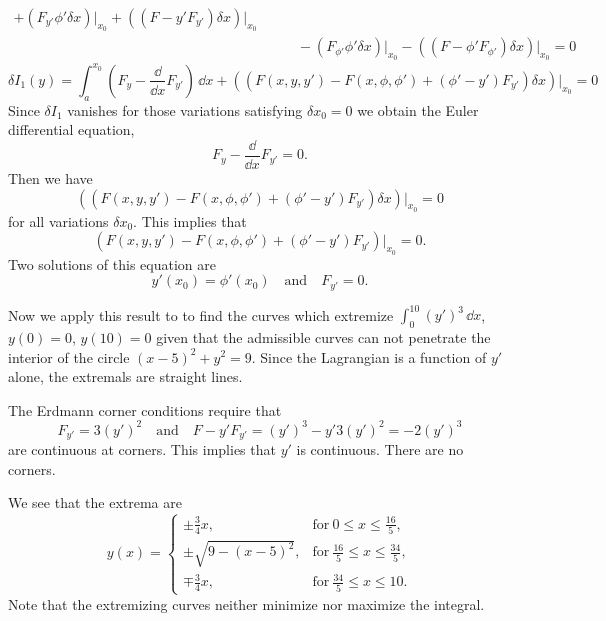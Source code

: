 \begin{Solution}
\begin{align*}
    + \left( F_{y'} \phi' \delta x \right) \bigg|_{x_0}
    + \left(( F - y' F_{y'} ) \delta x \right) \bigg|_{x_0} \\
    &\qquad - \left( F_{\phi'} \phi' \delta x \right) \bigg|_{x_0}
    - \left(( F - \phi' F_{\phi'} ) \delta x \right) \bigg|_{x_0} = 0
  \end{align*}
  \[
  \delta I_1(y) =
  \int_a^{x_0} \left( F_y - \frac{\dd}{\dd x} F_{y'} \right) \,\dd x
  + \left(( F(x,y,y') - F(x,\phi,\phi') 
    + (\phi' - y') F_{y'} ) \delta x \right) \bigg|_{x_0} = 0
  \]
  Since $\delta I_1$ vanishes for those variations satisfying $\delta x_0 = 0$
  we obtain the Euler differential equation,
  \[
  F_y - \frac{\dd}{\dd x} F_{y'} = 0.
  \]
  Then we have
  \[
  \left(( F(x,y,y') - F(x,\phi,\phi') 
    + (\phi' - y') F_{y'} ) \delta x \right) \bigg|_{x_0} = 0
  \]
  for all variations $\delta x_0$.  This implies that
  \[
  \left( F(x,y,y') - F(x,\phi,\phi') 
    + (\phi' - y') F_{y'}  \right) \bigg|_{x_0} = 0.
  \]
  Two solutions of this equation are 
  \[
  y'(x_0) = \phi'(x_0) \quad \mathrm{and} \quad
  F_{y'} = 0.
  \]

  \begin{center}
  \end{center}


  Now we apply this result to 
  to find the curves which extremize $\int_0^{10} (y')^3 \,\dd x$,
  $y(0) = 0$, $y(10) = 0$ given that the admissible curves can not
  penetrate the interior of the circle $(x-5)^2 + y^2 = 9$.
  Since the Lagrangian is a function of $y'$ alone, the extremals are straight
  lines.

  The Erdmann corner conditions require that 
  \[
  F_{y'} = 3 (y')^2 \quad \mathrm{and} \quad
  F - y' F_{y'} = (y')^3 - y' 3 (y')^2 = -2 (y')^3
  \]
  are continuous at corners.  This implies that $y'$ is continuous.  There are
  no corners.  

  We see that the extrema are
  \[
  \boxed{
    y(x) = 
    \begin{cases}
      \pm \frac{3}{4} x, &\mathrm{for}\ 0 \leq x \leq \frac{16}{5}, \\
      \pm \sqrt{9 - (x-5)^2}, &\mathrm{for}\ \frac{16}{5} \leq x \leq \frac{34}{5}, \\
      \mp \frac{3}{4} x, &\mathrm{for}\ \frac{34}{5} \leq x \leq 10.
    \end{cases}
    }
  \]
  Note that the extremizing curves neither minimize nor maximize the integral.
\end{Solution}



